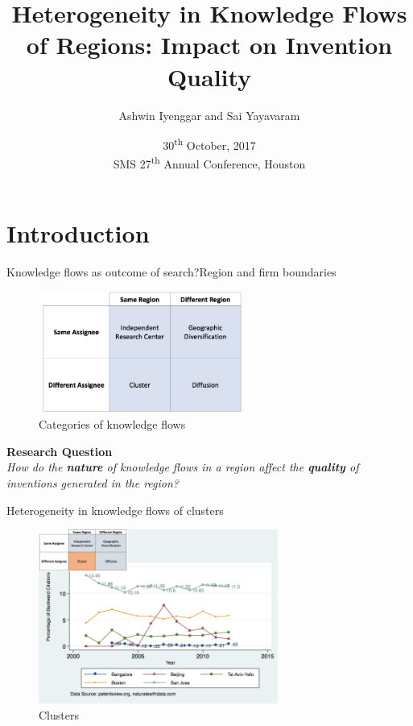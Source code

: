 \documentclass{beamer}
\title{Heterogeneity in Knowledge Flows of Regions: Impact on Invention Quality}
\author{Ashwin Iyenggar and Sai Yayavaram}
\institute[Indian Institute of Management Bangalore] 
{
  Strategy Area\\
  Indian Institute of Management Bangalore
}
\date{30\textsuperscript{th} October, 2017 \\ SMS 27\textsuperscript{th} Annual Conference, Houston}
\begin{document}
\begin{frame}
  \titlepage
\end{frame}



\section{Introduction}

\begin{frame}{Knowledge flows as outcome of search?}{Region and firm boundaries}
\begin{figure}[h!]
\begin{centering}
  \includegraphics[width=0.6\textwidth]{2x2old}
  \caption{Categories of knowledge flows}
   \label{fig:2x2old}
\end{centering}
\end{figure}
\textbf{Research Question}\\
\textit{How do the \textbf{nature} of knowledge flows in a region affect the \textbf{quality} of inventions generated in the region?}
\end{frame}

\begin{frame}{Heterogeneity in knowledge flows of clusters}
\begin{figure}[h]
\begin{centering}
  \includegraphics[width=0.7\textwidth]{SMSSameRegionDiffAssigneeFlows.png}
  \caption{Clusters}
   \label{fig:SMSSameRegionDiffAssigneeFlows}
\end{centering}
\end{figure}
\end{frame}
\end{document}
